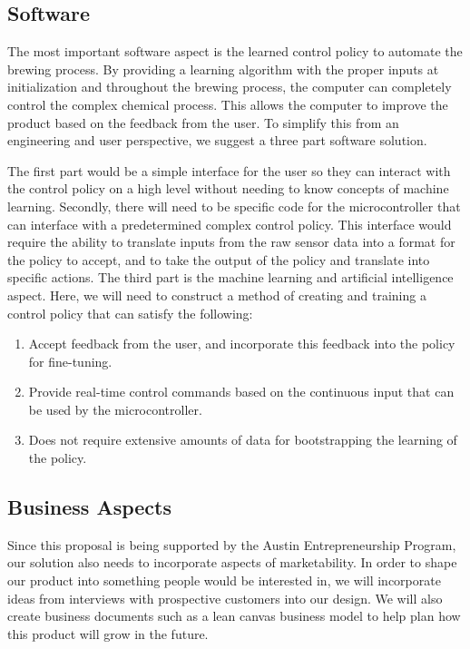 \documentclass[letterpaper,10pt]{article}
\begin{document}
\subsection{Software}
The most important software aspect is the learned control policy 
to automate the brewing process. By providing a learning algorithm with the proper 
inputs at initialization and throughout the brewing process, the computer can completely 
control the complex chemical process. This allows the computer to improve the product 
based on the feedback from the user. To simplify this from an engineering and user 
perspective, we suggest a three part software solution.

The first part would be a simple interface for the user so they can 
interact with the control policy on a high level without needing to know concepts of 
machine learning. Secondly, there will need to be specific code for the microcontroller 
that can interface with a predetermined complex control policy. This interface would 
require the ability to translate inputs from the raw sensor data into a format for 
the policy to accept, and to take the  output of the policy and translate into specific 
actions. The third part is the machine learning and artificial intelligence aspect.
Here, we will need to construct a method of creating and training a control policy 
that can satisfy the following:

\begin{enumerate}
	\item Accept feedback from the user, and incorporate this feedback into the 
		policy for fine-tuning.
	\item Provide real-time control commands based on the continuous input that 
		can be used by the microcontroller.
	\item Does not require extensive amounts of data for bootstrapping the learning 
		of the policy.
\end{enumerate}

\subsection{Business Aspects}
Since this proposal is being supported by the Austin Entrepreneurship Program, our 
solution also needs to incorporate aspects of marketability. In order to shape our 
product into something people would be interested in, we will incorporate ideas 
from interviews with prospective customers into our design. We will also create 
business documents such as a lean canvas business model to help plan how this product 
will grow in the future.
\end{document}
